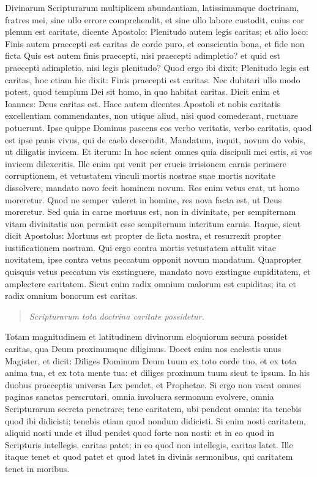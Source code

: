 Divinarum Scripturarum multiplicem abundantiam, latissimamque doctrinam, fratres mei, sine ullo errore comprehendit, et sine ullo labore custodit, cuius cor plenum est caritate, dicente Apostolo: Plenitudo autem legis caritas; et alio loco: Finis autem praecepti est caritas de corde puro, et conscientia bona, et fide non ficta Quis est autem finis praecepti, nisi praecepti adimpletio? et quid est praecepti adimpletio, nisi legis plenitudo? Quod ergo ibi dixit: Plenitudo legis est caritas, hoc etiam hic dixit: Finis praecepti est caritas. Nec dubitari ullo modo potest, quod templum Dei sit homo, in quo habitat caritas. Dicit enim et Ioannes: Deus caritas est. Haec autem dicentes Apostoli et nobis caritatis excellentiam commendantes, non utique aliud, nisi quod comederant, ructuare potuerunt. Ipse quippe Dominus pascens eos verbo veritatis, verbo caritatis, quod est ipse panis vivus, qui de caelo descendit, Mandatum, inquit, novum do vobis, ut diligatis invicem. Et iterum: In hoc scient omnes quia discipuli mei estis, si vos invicem dilexeritis. Ille enim qui venit per crucis irrisionem carnis perimere corruptionem, et vetustatem vinculi mortis nostrae suae mortis novitate dissolvere, mandato novo fecit hominem novum. Res enim vetus erat, ut homo moreretur. Quod ne semper valeret in homine, res nova facta est, ut Deus moreretur. Sed quia in carne mortuus est, non in divinitate, per sempiternam vitam divinitatis non permisit esse sempiternum interitum carnis. Itaque, sicut dicit Apostolus: Mortuus est propter de licta nostra, et resurrexit propter iustificationem nostram. Qui ergo contra mortis vetustatem attulit vitae novitatem, ipse contra vetus peccatum opponit novum mandatum. Quapropter quisquis vetus peccatum vis exstinguere, mandato novo exstingue cupiditatem, et amplectere caritatem. Sicut enim radix omnium malorum est cupiditas; ita et radix omnium bonorum est caritas.

\begin{quote}
\textit{Scripturarum tota doctrina caritate possidetur.}
\end{quote}

Totam magnitudinem et latitudinem divinorum eloquiorum secura possidet caritas, qua Deum proximumque diligimus. Docet enim nos caelestis unus Magister, et dicit: Diliges Dominum Deum tuum ex toto corde tuo, et ex tota anima tua, et ex tota mente tua: et diliges proximum tuum sicut te ipsum. In his duobus praeceptis universa Lex pendet, et Prophetae. Si ergo non vacat omnes paginas sanctas perscrutari, omnia involucra sermonum evolvere, omnia Scripturarum secreta penetrare; tene caritatem, ubi pendent omnia: ita tenebis quod ibi didicisti; tenebis etiam quod nondum didicisti. Si enim nosti caritatem, aliquid nosti unde et illud pendet quod forte non nosti: et in eo quod in Scripturis intellegis, caritas patet; in eo quod non intellegis, caritas latet. Ille itaque tenet et quod patet et quod latet in divinis sermonibus, qui caritatem tenet in moribus.

